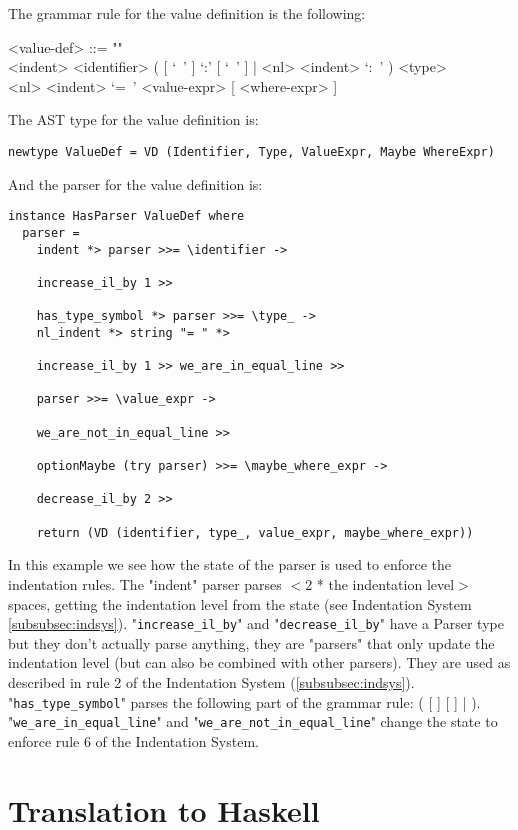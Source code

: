 \documentclass{article}
\def\H{Haskell}
\begin{document}
The grammar rule for the value definition is the following:
\begin{grammar}
<value-def> ::= ""\\
<indent> <identifier>
( [ `\ ' ] `:' [ `\ ' ] | <nl> <indent> `:\ ' ) <type>  \\
<nl> <indent> `=\ ' <value-expr> [ <where-expr> ]
\\
\end{grammar}
The AST type for the value definition is:
\begin{verbatim}
newtype ValueDef = VD (Identifier, Type, ValueExpr, Maybe WhereExpr)

\end{verbatim}
And the parser for the value definition is:
\begin{verbatim}
instance HasParser ValueDef where
  parser =
    indent *> parser >>= \identifier ->

    increase_il_by 1 >>

    has_type_symbol *> parser >>= \type_ ->
    nl_indent *> string "= " *>

    increase_il_by 1 >> we_are_in_equal_line >>

    parser >>= \value_expr ->

    we_are_not_in_equal_line >>

    optionMaybe (try parser) >>= \maybe_where_expr ->

    decrease_il_by 2 >>

    return (VD (identifier, type_, value_expr, maybe_where_expr))

\end{verbatim}
In this example we see how the state of the parser is used to enforce the
indentation rules. The "indent" parser parses $<$2 * the indentation level$>$
spaces, getting the indentation level from the state (see Indentation System
\ref{subsubsec:indsys}).  "\verb|increase_il_by|" and "\verb|decrease_il_by|"
have a Parser type but they don't actually parse anything, they are "parsers"
that only update the indentation level (but can also be combined with other
parsers).  They are used as described in rule 2 of the Indentation System
(\ref{subsubsec:indsys}). "\verb|has_type_symbol|" parses the following part of
the grammar rule: ( [ \lit{\ } ] \lit{:} [ \lit{\ } ] \verb||| 
 \lit{:\ }).  "\verb|we_are_in_equal_line|" and
"\verb|we_are_not_in_equal_line|" change the state to enforce rule 6 of the
Indentation System.

\newpage
\section{Translation to \H}
\end{document}
